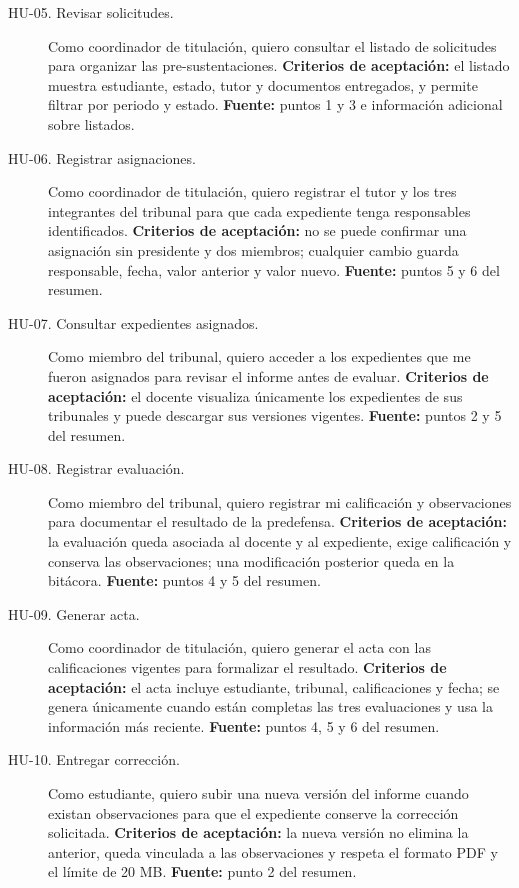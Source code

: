\begin{description}
    \item[HU-05. Revisar solicitudes.] Como coordinador de titulación, quiero
    consultar el listado de solicitudes para organizar las pre-sustentaciones.
    \textbf{Criterios de aceptación:} el listado muestra estudiante, estado,
    tutor y documentos entregados, y permite filtrar por periodo y estado.
    \textbf{Fuente:} puntos 1 y 3 e información adicional sobre listados.

    \item[HU-06. Registrar asignaciones.] Como coordinador de titulación,
    quiero registrar el tutor y los tres integrantes del tribunal para que cada
    expediente tenga responsables identificados.
    \textbf{Criterios de aceptación:} no se puede confirmar una asignación sin
    presidente y dos miembros; cualquier cambio guarda responsable, fecha,
    valor anterior y valor nuevo. \textbf{Fuente:} puntos 5 y 6 del resumen.

    \item[HU-07. Consultar expedientes asignados.] Como miembro del tribunal,
    quiero acceder a los expedientes que me fueron asignados para revisar el
    informe antes de evaluar.
    \textbf{Criterios de aceptación:} el docente visualiza únicamente los
    expedientes de sus tribunales y puede descargar sus versiones vigentes.
    \textbf{Fuente:} puntos 2 y 5 del resumen.

    \item[HU-08. Registrar evaluación.] Como miembro del tribunal, quiero
    registrar mi calificación y observaciones para documentar el resultado de
    la predefensa. \textbf{Criterios de aceptación:} la evaluación queda
    asociada al docente y al expediente, exige calificación y conserva las
    observaciones; una modificación posterior queda en la bitácora.
    \textbf{Fuente:} puntos 4 y 5 del resumen.

    \item[HU-09. Generar acta.] Como coordinador de titulación, quiero generar
    el acta con las calificaciones vigentes para formalizar el resultado.
    \textbf{Criterios de aceptación:} el acta incluye estudiante, tribunal,
    calificaciones y fecha; se genera únicamente cuando están completas las
    tres evaluaciones y usa la información más reciente.
    \textbf{Fuente:} puntos 4, 5 y 6 del resumen.

    \item[HU-10. Entregar corrección.] Como estudiante, quiero subir una nueva
    versión del informe cuando existan observaciones para que el expediente
    conserve la corrección solicitada.
    \textbf{Criterios de aceptación:} la nueva versión no elimina la anterior,
    queda vinculada a las observaciones y respeta el formato PDF y el límite de
    20 MB. \textbf{Fuente:} punto 2 del resumen.


\end{description}
